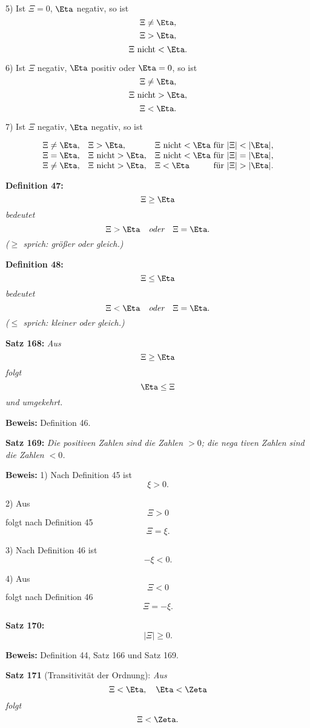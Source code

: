 5) Ist $\Xi = 0$, $\Eta$ negativ, so ist
$$\Xi \ne \Eta,$$
$$\Xi > \Eta,$$
$$\Xi\ \hbox{\rm nicht} < \Eta.$$

6) Ist $\Xi$ negativ, $\Eta$ positiv oder $\Eta = 0$, so ist
$$\Xi \ne \Eta,$$
$$\Xi\ \hbox{\rm nicht} > \Eta,$$
$$\Xi < \Eta.$$

7) Ist $\Xi$ negativ, $\Eta$ negativ, so ist

$$\vcenter{\halign{#\hfil\quad&#\hfil\quad&#\hfil\ &#\cr
$\Xi \ne \Eta$,&$\Xi > \Eta$,&$\Xi\ \hbox{\rm nicht} < \Eta$&f\"ur $|\Xi| < |\Eta|$,\cr
$\Xi = \Eta$,&$\Xi\ \hbox{\rm nicht} > \Eta$,&$\Xi\ \hbox{\rm nicht} < \Eta$&f\"ur $|\Xi| = |\Eta|$,\cr
$\Xi \ne \Eta$,&$\Xi\ \hbox{\rm nicht} > \Eta$,&$\Xi < \Eta$&f\"ur $|\Xi| > |\Eta|$.\cr}}$$
\medskip


{\bf Definition 47:} {\it $$\Xi \ge \Eta$$
bedeutet
$$\Xi > \Eta \quad\hbox{\it oder}\quad \Xi = \Eta.$$
{\rm ($\ge$ sprich: gr\"o{\ss}er oder gleich.)}}
\medskip


{\bf Definition 48:} {\it $$\Xi \le \Eta$$
bedeutet
$$\Xi < \Eta \quad\hbox{\it oder}\quad \Xi = \Eta.$$
{\rm ($\le$ sprich: kleiner oder gleich.)}}
\medskip


{\bf Satz 168:} {\it Aus
$$\Xi \ge \Eta$$
folgt
$$\Eta \le \Xi$$
und umgekehrt.}

{\bf Beweis:} Definition 46.
\medskip


{\bf Satz 169:} {\it Die positiven Zahlen sind die Zahlen $> 0$; die nega%
tiven Zahlen sind die Zahlen $< 0$.}

{\bf Beweis:} 1) Nach Definition 45 ist
$$\xi > 0.$$

2) Aus
$$\Xi > 0$$
folgt nach Definition 45
$$\Xi = \xi.$$

3) Nach Definition 46 ist
$$-\xi < 0.$$

4) Aus
$$\Xi < 0$$
folgt nach Definition 46
$$\Xi = -\xi.$$
\medskip


{\bf Satz 170:} {\it $$ |\Xi| \ge 0.$$}%

{\bf Beweis:} Definition 44, Satz 166 und Satz 169.
\medskip


{\bf Satz 171} (Transitivit\"at der Ordnung): {\it Aus
$$\Xi < \Eta,\quad \Eta < \Zeta$$
folgt
$$\Xi < \Zeta.$$}%

